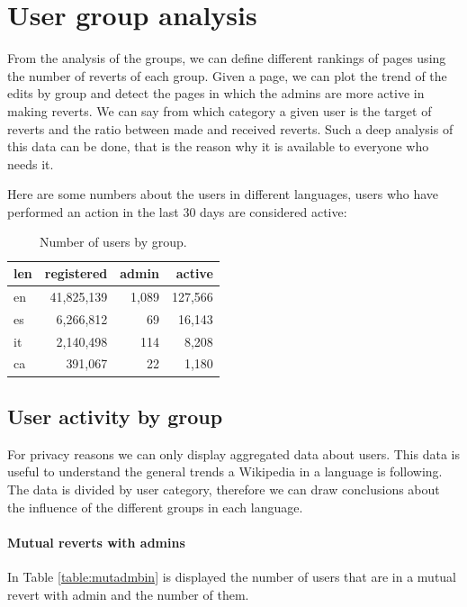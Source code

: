 \section{User group analysis}
From the analysis of the groups, we can define different rankings of pages using the number of
reverts of each group. Given a page, we can plot the trend of the edits by group and detect the
pages in which the admins are more active in making reverts. We can say from which category a given user
is the target of reverts and the ratio between made and received reverts. Such a deep analysis of
this data can be done, that is the reason why it is available to everyone who needs it. 

Here are some numbers about the users in different languages, users who have performed an action in
the last 30 days are considered active:
\begin{table}[H]
    \centering
    \begin{tabularx}{\columnwidth}{@{}Xrrr@{}}
        \midrule
        \textbf{len}& \textbf{registered} & \textbf{admin}& \textbf{active}  \\ \toprule
        en& 41,825,139& 1,089& 127,566  \\
        es & 6,266,812 & 69 & 16,143   \\
        it & 2,140,498 & 114 & 8,208\\
        ca & 391,067 & 22 & 1,180   \\
     

         \bottomrule
    \end{tabularx}
    
    \caption{Number of users by group. \label{table:statsuser}}
\end{table}

\subsection{User activity by group }
For privacy reasons we can only display aggregated data about users. This data is useful to
understand the general trends a Wikipedia in a language is following. The data is divided by user category, therefore we
can draw conclusions about the influence of the different groups in each language. 
\paragraph*{Mutual reverts with admins}
In Table \ref{table:mutadmbin}
is displayed the number of users that are in a mutual revert with admin and the number of them. 

